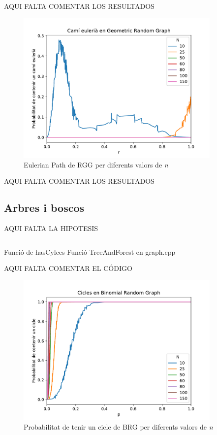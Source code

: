 AQUI FALTA COMENTAR LOS RESULTADOS

\begin{figure}[H]
    \centering
    \includegraphics[width=10cm]{plots/GRG_eulerianPath.pdf}
    \caption{Eulerian Path de RGG per diferents valors de \textit{n}}
    \label{fig:connect_04}
\end{figure}

AQUI FALTA COMENTAR LOS RESULTADOS

\subsection{Arbres i boscos}
AQUI FALTA LA HIPOTESIS

\begin{listing}
\inputminted[firstline=27,lastline=57]{cpp}{src/graph.cpp}
\caption{Funció de hasCylces Funció TreeAndForest en graph.cpp}
\end{listing}

AQUI FALTA COMENTAR EL CÓDIGO

\begin{figure}[H]
    \centering
    \includegraphics[width=10cm]{plots/BRG_cicle.pdf}
    \caption{Probabilitat de tenir un cicle de BRG per diferents valors de \textit{n}}
    \label{fig:connect_04}
\end{figure}

